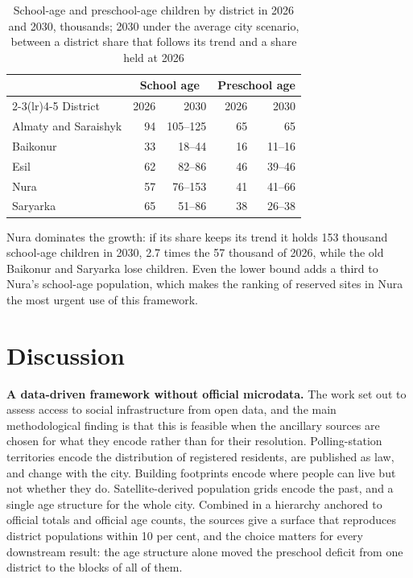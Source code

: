 \begin{table}[ht]
\centering
\caption{School-age and preschool-age children by district in 2026 and 2030, thousands; 2030 under the average city scenario, between a district share that follows its trend and a share held at 2026}
\label{tab:projection-districts}
\small
\begin{tabular}{lrrrr}
\toprule
& \multicolumn{2}{c}{School age} & \multicolumn{2}{c}{Preschool age} \\
\cmidrule(lr){2-3}\cmidrule(lr){4-5}
District & 2026 & 2030 & 2026 & 2030 \\
\midrule
Almaty and Saraishyk & 94 & 105--125 & 65 & 65 \\
Baikonur & 33 & 18--44 & 16 & 11--16 \\
Esil & 62 & 82--86 & 46 & 39--46 \\
Nura & 57 & 76--153 & 41 & 41--66 \\
Saryarka & 65 & 51--86 & 38 & 26--38 \\
\bottomrule
\end{tabular}
\end{table}

Nura dominates the growth: if its share keeps its trend it holds 153 thousand school-age children in 2030, 2.7 times the 57 thousand of 2026, while the old Baikonur and Saryarka lose children. Even the lower bound adds a third to Nura's school-age population, which makes the ranking of reserved sites in Nura the most urgent use of this framework.

\section{Discussion}
\label{sec:discussion}

\textbf{A data-driven framework without official microdata.} The work set out to assess access to social infrastructure from open data, and the main methodological finding is that this is feasible when the ancillary sources are chosen for what they encode rather than for their resolution. Polling-station territories encode the distribution of registered residents, are published as law, and change with the city. Building footprints encode where people can live but not whether they do. Satellite-derived population grids encode the past, and a single age structure for the whole city. Combined in a hierarchy anchored to official totals and official age counts, the sources give a surface that reproduces district populations within 10 per cent, and the choice matters for every downstream result: the age structure alone moved the preschool deficit from one district to the blocks of all of them.

